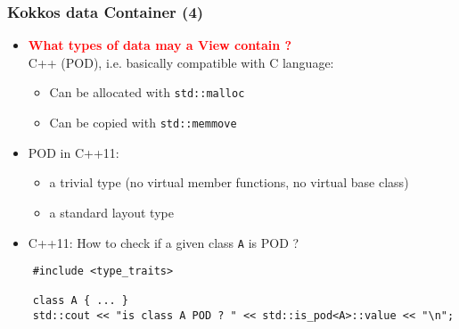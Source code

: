 \begin{frame}[fragile=singleslide]
  \frametitle{Kokkos data Container (4)}

  \begin{itemize}
  \item \textcolor{red}{\textbf{What types of data may a View contain ?}}\\
    C++  (POD), i.e. basically compatible with C language:
    \begin{itemize}
    \item Can be allocated with \texttt{std::malloc}
    \item Can be copied with \texttt{std::memmove}
    \end{itemize}
  \item POD in C++11: 
    \begin{itemize}
    \item a trivial type (no virtual member functions, no virtual base class)
    \item a standard layout type
    \end{itemize}
  \item C++11: How to check if a given class \texttt{A} is POD ?
  \end{itemize}
  \begin{verbatim}
    #include <type_traits>
    
    class A { ... }
    std::cout << "is class A POD ? " << std::is_pod<A>::value << "\n";
  \end{verbatim}
  
\end{frame}

